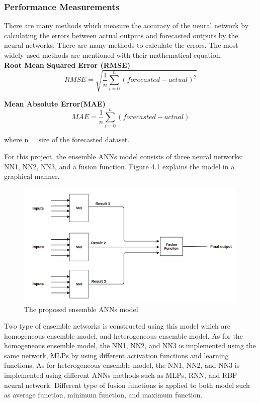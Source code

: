 \subsubsection{Performance Measurements}
There are many methods which measure the accuracy of the neural network by calculating the errors between actual outputs and forecasted outputs by the neural networks. There are many methods to calculate the errors. The most widely used methods are mentioned with their mathematical equation.
\\

\textbf{Root Mean Squared Error (RMSE)}\\
\begin{equation*}
	RMSE= \sqrt{\frac {1}{n}\sum_{i=0}^n(forecasted -  actual )^2} 
\end{equation*}

\textbf{Mean Absolute Error(MAE)}\\
\begin{equation*}
	MAE= \frac {1}{n} \sum_{i=0}^n (forecasted - actual)
\end{equation*}

where  n =  size of the forecasted dataset.

For this project, the ensemble ANNs model consists of three neural networks: NN1, NN2, NN3, and a fusion function. Figure 4.1 explains the model in a graphical manner.

\begin{figure}[hbt!]\centering
	\includegraphics[width=1\textwidth]{ensemblemodel}
	\caption{The proposed ensemble ANNs model}
\end{figure}

Two type of ensemble networks is constructed using this model which are homogeneous ensemble model, and  heterogeneous ensemble model. As for the homogeneous ensemble model, the NN1, NN2, and NN3 is implemented using the same network, MLPs by using different activation functions and learning functions. As for heterogeneous ensemble model, the NN1, NN2, and NN3 is implemented using different ANNs methods such as MLPs, RNN, and RBF neural network. Different type of fusion functions is applied to both model such as average function, minimum function, and maximum function.

